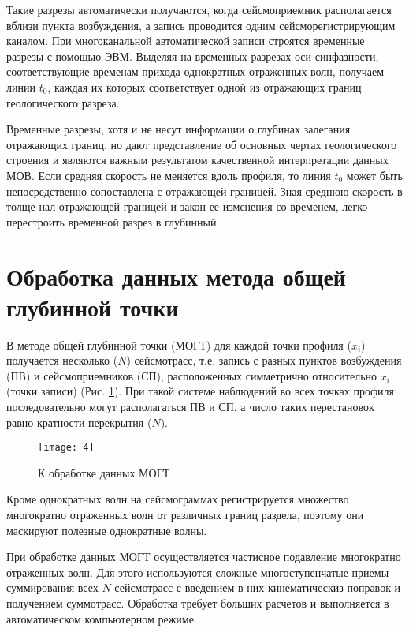 Такие разрезы автоматически получаются, когда сейсмоприемник располагается вблизи пункта возбуждения, а запись проводится одним сейсморегистрирующим каналом. При многоканальной автоматической записи строятся временные разрезы с помощью ЭВМ. Выделяя на временных разрезах оси синфазности, соответствующие временам прихода однократных отраженных волн, получаем линии $t_0$, каждая их которых соответствует одной из отражающих границ геологического разреза.

Временные разрезы, хотя и не несут информации о глубинах залегания отражающих границ, но дают представление об основных чертах геологического строения и являются важным результатом качественной интерпретации данных МОВ. Если средняя скорость не меняется вдоль профиля, то линия $t_0$ может быть непосредственно сопоставлена с отражающей границей. Зная среднюю скорость в толще нал отражающей границей и закон ее изменения со временем, легко перестроить временной разрез в глубинный.

\section*{Обработка данных метода общей глубинной точки}

В методе общей глубинной точки (МОГТ) для каждой точки профиля ($x_i$) получается несколько ($N$) сейсмотрасс, т.е. запись с разных пунктов возбуждения (ПВ) и сейсмоприемников (СП), расположенных симметрично относительно $x_i$ (точки записи) (Рис. \ref{4}). При такой системе наблюдений во всех точках профиля последовательно могут располагаться ПВ и СП, а число таких перестановок равно кратности перекрытия ($N$).

\begin{figure}[H]
	\centering
	\texttt{[image: 4]}
	\caption{К обработке данных МОГТ}
	\label{4}
\end{figure}

Кроме однократных волн на сейсмограммах регистрируется множество многократно отраженных волн от различных границ раздела, поэтому они маскируют полезные однократные волны.

При обработке данных МОГТ осуществляется частисное подавление многократно отраженных волн. Для этого используются сложные многоступенчатые приемы суммирования всех $N$ сейсмотрасс с введением в них кинематическиз поправок и получением суммотрасс. Обработка требует больших расчетов и выполняется в автоматическом компьютерном режиме.

